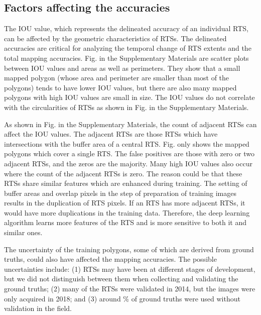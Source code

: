 \documentclass[authoryear,preprint,review,12pt]{elsarticle}
\begin{document}
\subsection{Factors affecting the accuracies}
\label{subsec_acc_factors}

The IOU value, which represents the delineated accuracy of an individual RTS, can be affected by the geometric characteristics of RTSs.
The delineated accuracies are critical for analyzing the temporal change of RTS extents and the total mapping accuracies.
Fig.  in the Supplementary Materials are scatter plots between IOU values and areas as well as perimeters. They show that a small mapped polygon (whose area and perimeter are smaller than most of the polygons) tends to have lower IOU values, but there are also many mapped polygons with high IOU values are small in size. 
The IOU values do not correlate with the circularities of RTSs as shown in Fig.  in the Supplementary Materials. 


As shown in Fig.  in the Supplementary Materials, the count of adjacent RTSs can affect the IOU values. The adjacent RTSs are those RTSs which have intersections with the buffer area of a central RTS. Fig.  only shows the mapped polygons which cover a single RTS. The false positives are those with zero or two adjacent RTSs, and the zeros are the majority. Many high IOU values also occur where the count of the adjacent RTSs is zero. The reason could be that these RTSs share similar features which are enhanced during training. The setting of buffer areas and overlap pixels in the step of preparation of training images results in the duplication of RTS pixels. If an RTS has more adjacent RTSs, it would have more duplications in the training data. Therefore, the deep learning algorithm learns more features of the RTS and is more sensitive to both it and similar ones. 

The uncertainty of the training polygons, some of which are derived from ground truths, could also have affected the mapping accuracies. The possible uncertainties include: (1) RTSs may have been at different stages of development, but we did not distinguish between them when collecting and validating the ground truths; (2) many of the RTSs were validated in 2014, but the images were only acquired in 2018; and (3) around \% of ground truths were used without validation in the field. 
\end{document}
